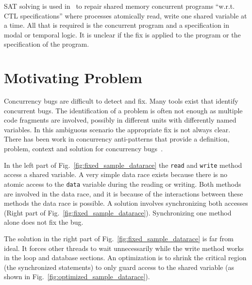 \documentclass{llncs}
\begin{document}
SAT solving is used in~\cite{AY07}  to repair shared memory concurrent programs
``w.r.t. CTL specifications'' where processes atomically read, write one shared
variable at a time. All that is required is the concurrent program and a
specification in modal or temporal logic. It is unclear if the fix is applied
to the program or the specification of the program.

\section{Motivating Problem}
\label{sec:motivation}

Concurrency bugs are difficult to detect and fix. Many tools exist that
identify concurrent bugs. The identification of a problem is often not enough
as multiple code fragments are involved, possibly in different units with
differently named variables. In this ambiguous scenario the appropriate fix is
not always clear. There has been work in concurrency anti-patterns that provide
a definition, problem, context and solution for concurrency
bugs~\cite{BJ09,FKLV12}.

In the left part of Fig.~\ref{fig:fixed_sample_datarace} the \texttt{read} and
\texttt{write} method access a shared variable. A very simple data race exists
because there is no atomic access to the \texttt{data} variable during the
reading or writing. Both methods are involved in the data race, and it is
because of the interactions between these methods the data race is possible. A
solution involves synchronizing both accesses (Right part of
Fig.~\ref{fig:fixed_sample_datarace}). Synchronizing one method alone does not
fix the bug.

The solution in the right part of Fig.~\ref{fig:fixed_sample_datarace} is far
from ideal. It forces other threads to wait unnecessarily while the write
method works in the loop and database sections. An optimization is to shrink
the critical region (the synchronized statements) to only guard access to the
shared variable (as shown in Fig.~\ref{fig:optimized_sample_datarace}).
\end{document}
